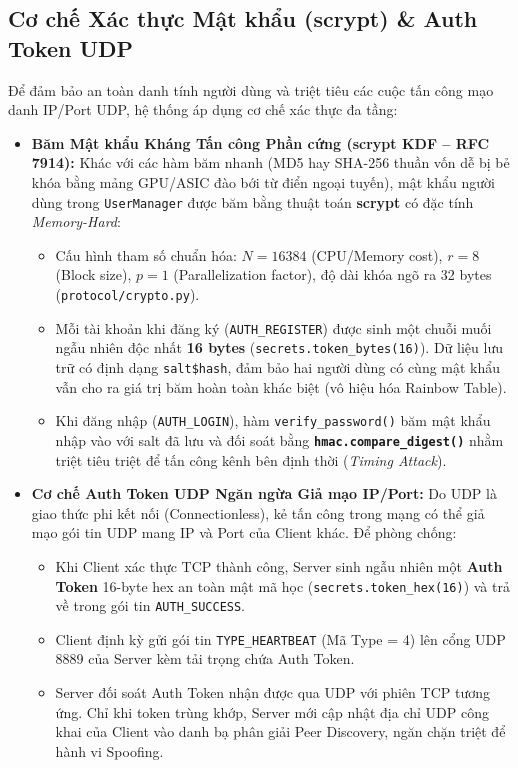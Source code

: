 \documentclass[11pt,a4paper]{article}
\begin{document}
\subsection{Cơ chế Xác thực Mật khẩu (scrypt) \& Auth Token UDP}
Để đảm bảo an toàn danh tính người dùng và triệt tiêu các cuộc tấn công mạo danh IP/Port UDP, hệ thống áp dụng cơ chế xác thực đa tầng:
\begin{itemize}
    \item \textbf{Băm Mật khẩu Kháng Tấn công Phần cứng (scrypt KDF -- RFC 7914):} Khác với các hàm băm nhanh (MD5 hay SHA-256 thuần vốn dễ bị bẻ khóa bằng mảng GPU/ASIC đào bới từ điển ngoại tuyến), mật khẩu người dùng trong \texttt{UserManager} được băm bằng thuật toán \textbf{scrypt} có đặc tính \textit{Memory-Hard}:
    \begin{itemize}
        \item Cấu hình tham số chuẩn hóa: $N=16384$ (CPU/Memory cost), $r=8$ (Block size), $p=1$ (Parallelization factor), độ dài khóa ngõ ra 32 bytes (\texttt{protocol/crypto.py}).
        \item Mỗi tài khoản khi đăng ký (\texttt{AUTH\_REGISTER}) được sinh một chuỗi muối ngẫu nhiên độc nhất \textbf{16 bytes} (\texttt{secrets.token\_bytes(16)}). Dữ liệu lưu trữ có định dạng \texttt{salt\$hash}, đảm bảo hai người dùng có cùng mật khẩu vẫn cho ra giá trị băm hoàn toàn khác biệt (vô hiệu hóa Rainbow Table).
        \item Khi đăng nhập (\texttt{AUTH\_LOGIN}), hàm \texttt{verify\_password()} băm mật khẩu nhập vào với salt đã lưu và đối soát bằng \textbf{\texttt{hmac.compare\_digest()}} nhằm triệt tiêu triệt để tấn công kênh bên định thời (\textit{Timing Attack}).
    \end{itemize}
    \item \textbf{Cơ chế Auth Token UDP Ngăn ngừa Giả mạo IP/Port:} Do UDP là giao thức phi kết nối (Connectionless), kẻ tấn công trong mạng có thể giả mạo gói tin UDP mang IP và Port của Client khác. Để phòng chống:
    \begin{itemize}
        \item Khi Client xác thực TCP thành công, Server sinh ngẫu nhiên một \textbf{Auth Token} 16-byte hex an toàn mật mã học (\texttt{secrets.token\_hex(16)}) và trả về trong gói tin \texttt{AUTH\_SUCCESS}.
        \item Client định kỳ gửi gói tin \texttt{TYPE\_HEARTBEAT} (Mã Type = 4) lên cổng UDP 8889 của Server kèm tải trọng chứa Auth Token.
        \item Server đối soát Auth Token nhận được qua UDP với phiên TCP tương ứng. Chỉ khi token trùng khớp, Server mới cập nhật địa chỉ UDP công khai của Client vào danh bạ phân giải Peer Discovery, ngăn chặn triệt để hành vi Spoofing.
    \end{itemize}
\end{itemize}
\end{document}
